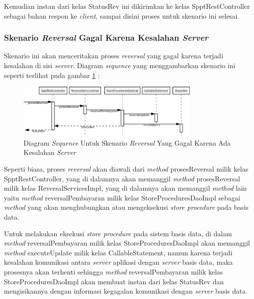 \documentclass[pdftex,12pt, oneside]{article}
\begin{document}
Kemudian instan dari kelas StatusRev ini dikirimkan ke kelas SpptRestController sebagai bahan respon ke \textit{client}, sampai disini proses untuk skenario ini selesai.

\subsubsection{Skenario \textit{Reversal} Gagal Karena Kesalahan \textit{Server}}

Skenario ini akan menceritakan proses \textit{reversal} yang gagal karena terjadi kesalahan di sisi \textit{server}. Diagram \textit{sequence} yang menggambarkan skenario ini seperti terlihat pada gambar \ref{fig:uml-seq-rev-db-error} :

\begin{figure}[H]
  \centering
  \includegraphics[width=0.8\textwidth]{./resources/diagram/uml-seq-rev-db-error}
  \caption{Diagram \textit{Sequence} Untuk Skenario \textit{Reversal} Yang Gagal Karena Ada Kesalahan \textit{Server}}
  \label{fig:uml-seq-rev-db-error}
\end{figure}

Seperti biasa, proses \textit{reversal} akan diawali dari \textit{method} prosesReversal milik kelas SpptRestController, yang di dalamnya akan memanggil \textit{method} prosesReversal milik kelas ReversalServicesImpl, yang di dalamnya akan memanggil \textit{method} lain yaitu \textit{method} reversalPembayaran milik kelas StoreProceduresDaoImpl sebagai \textit{method} yang akan menghubungkan atau mengeksekusi \textit{store procedure} pada basis data.

Untuk melakukan eksekusi \textit{store procedure} pada sistem basis data, di dalam \textit{method} reversalPembayaran milik kelas StoreProceduresDaoImpl akan memanggil \textit{method} executeUpdate milik kelas CallableStatement, namun karena terjadi kesalahan komunikasi antara \textit{server} aplikasi dengan \textit{server} basis data, maka prosesnya akan terhenti sehingga \textit{method} reversalPembayaran milik kelas StoreProceduresDaoImpl akan membuat instan dari kelas StatusRev dan mengisikannya dengan informasi kegagalan komunikasi dengan \textit{server} basis data.
\end{document}
